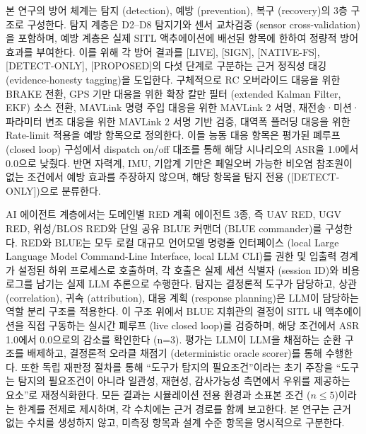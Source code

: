 본 연구의 방어 체계는 탐지 (detection), 예방 (prevention), 복구 (recovery)의 3층 구조로 구성한다. 
%
탐지 계층은 D2--D8 탐지기와 센서 교차검증 (sensor cross-validation)을 포함하며, 예방 계층은 실제 SITL 액추에이션에 배선된 항목에 한하여 정량적 방어 효과를 부여한다. 이를 위해 각 방어 결과를 [LIVE], [SIGN], [NATIVE-FS], [DETECT-ONLY], [PROPOSED]의 다섯 단계로 구분하는 근거 정직성 태깅 (evidence-honesty tagging)을 도입한다. 
%
구체적으로 RC 오버라이드 대응을 위한 BRAKE 전환, GPS 기만 대응을 위한 확장 칼만 필터 (extended Kalman Filter, EKF) 소스 전환, MAVLink 명령 주입 대응을 위한 MAVLink 2 서명, 재전송·미션·파라미터 변조 대응을 위한 MAVLink 2 서명 기반 검증, 대역폭 플러딩 대응을 위한 Rate-limit 적용을 예방 항목으로 정의한다. 
%
이들 능동 대응 항목은 평가된 폐루프 (closed loop) 구성에서 dispatch on/off 대조를 통해 해당 시나리오의 ASR을 1.0에서 0.0으로 낮췄다. 
%
반면 자력계, IMU, 기압계 기만은 페일오버 가능한 비오염 참조원이 없는 조건에서 예방 효과를 주장하지 않으며, 해당 항목을 탐지 전용 ([DETECT-ONLY])으로 분류한다.
%

AI 에이전트 계층에서는 도메인별 RED 계획 에이전트 3종, 즉 UAV RED, UGV RED, 위성/BLOS RED와 단일 공유 BLUE 커맨더 (BLUE commander)를 구성한다. 
%
RED와 BLUE는 모두 로컬 대규모 언어모델 명령줄 인터페이스 (local Large Language Model Command-Line Interface, local LLM CLI)를 권한 및 입출력 경계가 설정된 하위 프로세스로 호출하며, 각 호출은 실제 세션 식별자 (session ID)와 비용 로그를 남기는 실제 LLM 추론으로 수행한다. 
%
탐지는 결정론적 도구가 담당하고, 상관 (correlation), 귀속 (attribution), 대응 계획 (response planning)은 LLM이 담당하는 역할 분리 구조를 적용한다. 이 구조 위에서 BLUE 지휘관의 결정이 SITL 내 액추에이션을 직접 구동하는 실시간 폐루프 (live closed loop)를 검증하며, 해당 조건에서 ASR 1.0에서 0.0으로의 감소를 확인한다 (n=3). 
%
평가는 LLM이 LLM을 채점하는 순환 구조를 배제하고, 결정론적 오라클 채점기 (deterministic oracle scorer)를 통해 수행한다. 
%
또한 독립 재판정 절차를 통해 “도구가 탐지의 필요조건”이라는 초기 주장을 “도구는 탐지의 필요조건이 아니라 일관성, 재현성, 감사가능성 측면에서 우위를 제공하는 요소”로 재정식화한다. 모든 결과는 시뮬레이션 전용 환경과 소표본 조건 ($n \le 5$)이라는 한계를 전제로 제시하며, 각 수치에는 근거 경로를 함께 보고한다. 본 연구는 근거 없는 수치를 생성하지 않고, 미측정 항목과 설계 수준 항목을 명시적으로 구분한다.

